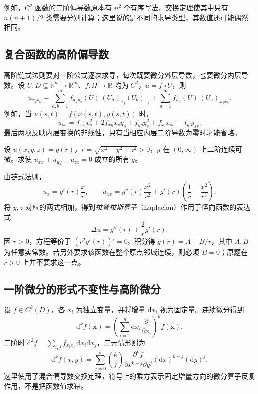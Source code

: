 例如，$C^2$ 函数的二阶偏导数原本有 $n^2$ 个有序写法，交换定理使其中只有 $n(n+1)/2$ 类需要分别计算；这里说的是不同的求导类型，其数值还可能偶然相同。

\subsection{复合函数的高阶偏导数}
\label{subsec:higher-partial-derivatives-of-composite-functions}

高阶链式法则要对一阶公式逐次求导，每次既要微分外层导数，也要微分内层导数。设 $U:D\subseteq\mathbb R^n\to\mathbb R^m$、$f:\Omega\to\mathbb R$ 均为 $C^2$，$u=f\circ U$，则
\begin{equation}
\label{eq:second-order-chain-rule-ch14}
    u_{x_jx_k}
    =\sum_{a,b=1}^m f_{u_au_b}(U)\,(U_a)_{x_j}(U_b)_{x_k}
      +\sum_{a=1}^m f_{u_a}(U)\,(U_a)_{x_jx_k}.
\end{equation}
例如，当 $u(s,t)=f(x(s,t),y(s,t))$ 时，
\[
    u_{ss}=f_{xx}x_s^2+2f_{xy}x_sy_s+f_{yy}y_s^2
        +f_x\,x_{ss}+f_y\,y_{ss}.
\]
最后两项反映内层变换的非线性，只有当相应内层二阶导数为零时才能省略。

\begin{example}
\label{ex:radial-harmonic-function-ch14}
设 $u(x,y,z)=g(r)$，$r=\sqrt{x^2+y^2+z^2}>0$，$g$ 在 $(0,\infty)$ 上二阶连续可微。求使 $u_{xx}+u_{yy}+u_{zz}=0$ 成立的所有 $g$。
\end{example}
\begin{solve}
由链式法则，
\[
    u_x=g'(r)\frac{x}{r},\qquad
    u_{xx}=g''(r)\frac{x^2}{r^2}
        +g'(r)\left(\frac1r-\frac{x^2}{r^3}\right).
\]
将 $y,z$ 对应的两式相加，得到\emph{拉普拉斯算子}（Laplacian）作用于径向函数的表达式
\[
    \Delta u=g''(r)+\frac2r g'(r).
\]
因 $r>0$，方程等价于 $(r^2g'(r))'=0$。积分得 $g(r)=A+B/r$，其中 $A,B$ 为任意实常数。若另外要求该函数在整个原点邻域连续，则必须 $B=0$；原题在 $r>0$ 上并不要求这一点。
\end{solve}

\subsection{一阶微分的形式不变性与高阶微分}
\label{subsec:invariance-and-higher-multivariable-differentials}

设 $f\in C^k(D)$，各 $x_i$ 为独立变量，并将增量 $\mathrm dx_i$ 视为固定量。连续微分得到
\begin{equation}
\label{eq:higher-total-differentials-ch14}
    \mathrm d^k f(\boldsymbol x)
    =\left(\sum_{i=1}^n\mathrm dx_i\frac{\partial}{\partial x_i}\right)^k
       f(\boldsymbol x).
\end{equation}
二阶时 $\mathrm d^2f=\sum_{i,j}f_{x_ix_j}\,\mathrm dx_i\mathrm dx_j$，二元情形则为
\[
    \mathrm d^kf(x,y)=\sum_{j=0}^k\binom kj
       \frac{\partial^kf}{\partial x^{k-j}\partial y^j}
       (\mathrm dx)^{k-j}(\mathrm dy)^j.
\]
这里使用了混合偏导数交换定理，符号上的乘方表示固定增量方向的微分算子反复作用，不是把函数值求幂。

